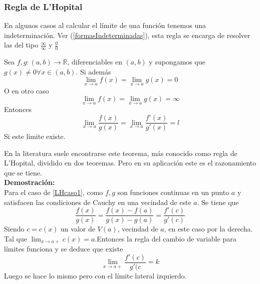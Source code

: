 \documentclass[10pt,twoside]{SelfArx} %
\begin{document}
  \subsubsection{Regla de L'Hopital}
   En algunos casos al calcular el límite de una función tenemos una indeterminación. Ver (\ref{formasIndeterminadas}), esta regla se encarga de resolver las del tipo $ \frac{\infty}{\infty} $ y   $ \frac{0}{0} $
   \begin{teorema}
   	Sea $ f,g:(a,b)\rightarrow\mathbb{R} $, diferenciables en $ (a,b) $ y supongamos que $ g(x)\neq0 \forall x\in(a,b) $. Si adem\'as
   	\begin{equation}
   	\lim_{x\rightarrow a}f(x)=\lim_{x\rightarrow a}g(x)=0
   	\end{equation}
   	O en otro caso
   	\begin{equation}
   	   	\lim_{x\rightarrow a}f(x)=\lim_{x\rightarrow a}g(x)=\infty\label{LHcaso1}
   	\end{equation}
   	Entonces 
   	\begin{equation}
   	   	\lim_{x\rightarrow a}\dfrac{f(x)}{g(x)}=\lim_{x\rightarrow a}\dfrac{f'(x)}{g'(x)}=l\label{LHcaso2}
   	\end{equation}
   	Si este l\'imite existe.
   \end{teorema}
   En la literatura suele encontrarse este teorema, m\'as conocido como regla de L'Hopital, dividido en dos teoremas. Pero en su aplicaci\'on este es el razonamiento que se tiene.\\
   \textbf{Demostración:}\\
   Para el caso de \ref{LHcaso1}, como $ f,g $ son funciones continuas en un punto $ a $ y satisfacen las condiciones de Cauchy en una vecindad de este $ a $. Se tiene que 
   \begin{equation}
   \dfrac{f(x)}{g(x)}=  \dfrac{f(x)-f(a)}{g(x)-g(a)}=  \dfrac{f'(c)}{g'(c)}
   \end{equation}
   Siendo $ c=c(x) $ un valor de $ V(a) $, vecindad de $ a $, en este caso por la derecha. Tal que $ \lim_{x\rightarrow a+}c(x)=a $.Entonces la regla del cambio de variable para l\'imites funciona y se deduce que existe
   \begin{equation}
   \lim\limits_{x\rightarrow a+}\dfrac{f'(c)}{g'(c}=k
   \end{equation}
   Luego se hace lo mismo pero con el l\'imite lateral izquierdo.
\end{document}
